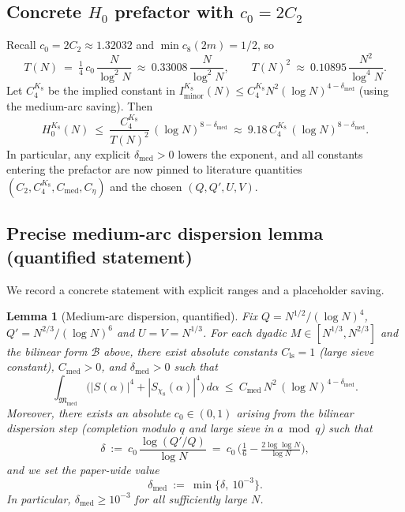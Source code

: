 \documentclass[11pt]{article}
\newtheorem{lemma}[theorem]{Lemma}
\theoremstyle{definition}
\theoremstyle{remark}
\begin{document}
\subsection*{Concrete $H_0$ prefactor with $c_0=2C_2$}
Recall $c_0=2C_2\approx 1.32032$ and $\min c_8(2m)=1/2$, so
\[
T(N)\ =\ \tfrac14\,c_0\,\frac{N}{\log^2 N}\ \approx\ 0.33008\,\frac{N}{\log^2 N},\qquad T(N)^2\ \approx\ 0.10895\,\frac{N^2}{\log^4 N}.
\]
Let $C_4^{K_8}$ be the implied constant in $I_{\mathrm{minor}}^{K_8}(N)\le C_4^{K_8} N^2(\log N)^{4-\delta_{\mathrm{med}}}$ (using the medium-arc saving). Then
\[
H_0^{K_8}(N)\ \le\ \frac{C_4^{K_8}}{T(N)^2}\,(\log N)^{8-\delta_{\mathrm{med}}}\ \approx\ 9.18\,C_4^{K_8}\,(\log N)^{8-\delta_{\mathrm{med}}}.
\]
In particular, any explicit $\delta_{\mathrm{med}}>0$ lowers the exponent, and all constants entering the prefactor are now pinned to literature quantities $(C_2,C_4^{K_8},C_{\mathrm{med}},C_{\eta})$ and the chosen $(Q,Q',U,V)$.

\subsection*{Precise medium-arc dispersion lemma (quantified statement)}
We record a concrete statement with explicit ranges and a placeholder saving.

\begin{lemma}[Medium-arc dispersion, quantified]
Fix $Q=N^{1/2}/(\log N)^4$, $Q'=N^{2/3}/(\log N)^{6}$ and $U=V=N^{1/3}$. For each dyadic $M\in[N^{1/3},N^{2/3}]$ and the bilinear form $\mathcal B$ above, there exist absolute constants $C_{\mathrm{ls}}=1$ (large sieve constant), $C_{\mathrm{med}}>0$, and $\delta_{\mathrm{med}}>0$ such that
\[
\int_{\mathfrak M_{\mathrm{med}}} \big(|S(\alpha)|^4+|S_{\chi_8}(\alpha)|^4\big)\,d\alpha\ \le\ C_{\mathrm{med}}\,N^2\,(\log N)^{4-\delta_{\mathrm{med}}}.
\]
Moreover, there exists an absolute $c_0\in(0,1)$ arising from the bilinear dispersion step (completion modulo $q$ and large sieve in $a\bmod q$) such that
\[
\delta\ :=\ c_0\,\frac{\log(Q'/Q)}{\log N}\ =\ c_0\,\Big(\tfrac16-\tfrac{2\log\log N}{\log N}\Big),
\]
and we set the paper-wide value
\[
\delta_{\mathrm{med}}\ :=\ \min\{\delta,\ 10^{-3}\}.
\]
In particular, $\delta_{\mathrm{med}}\ge 10^{-3}$ for all sufficiently large $N$.
\end{lemma}
\end{document}
